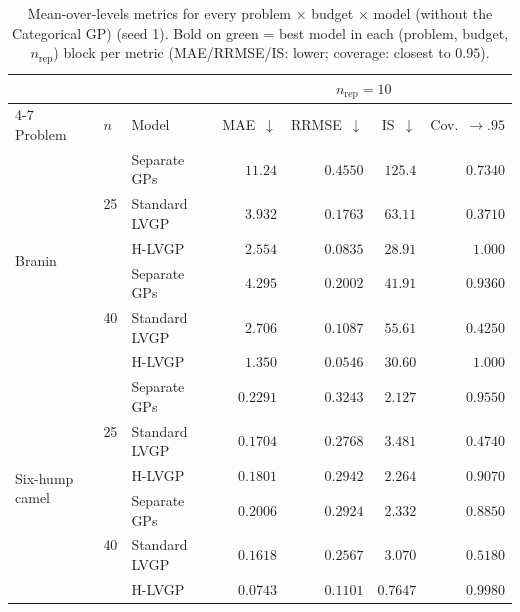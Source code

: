 \begin{table}[htbp]
\centering
\small
\setlength{\tabcolsep}{3.5pt}
\setlength{\fboxsep}{1.5pt}
\caption{Mean-over-levels metrics for every problem $\times$ budget $\times$ model (without the Categorical GP) (seed 1). Bold on green = best model in each (problem, budget, $n_{\mathrm{rep}}$) block per metric (MAE/RRMSE/IS: lower; coverage: closest to $0.95$).}
\label{tab:summary_nocat}
\begin{tabular}{lllrrrr}
\toprule
 & & & \multicolumn{4}{c}{$n_{\mathrm{rep}}=10$} \\
\cmidrule(lr){4-7}
Problem & $n$ & Model & MAE~$\downarrow$ & RRMSE~$\downarrow$ & IS~$\downarrow$ & Cov.~$\to.95$ \\
\midrule
\multirow{6}{*}{Branin} & \multirow{3}{*}{25} & Separate GPs & $11.24$ & $0.4550$ & $125.4$ & $0.7340$ \\
 &  & Standard LVGP & $3.932$ & $0.1763$ & $63.11$ & $0.3710$ \\
 &  & H-LVGP & \colorbox{green!20}{\boldmath$2.554$} & \colorbox{green!20}{\boldmath$0.0835$} & \colorbox{green!20}{\boldmath$28.91$} & \colorbox{green!20}{\boldmath$1.000$} \\
\cmidrule(lr){2-7}
 & \multirow{3}{*}{40} & Separate GPs & $4.295$ & $0.2002$ & $41.91$ & \colorbox{green!20}{\boldmath$0.9360$} \\
 &  & Standard LVGP & $2.706$ & $0.1087$ & $55.61$ & $0.4250$ \\
 &  & H-LVGP & \colorbox{green!20}{\boldmath$1.350$} & \colorbox{green!20}{\boldmath$0.0546$} & \colorbox{green!20}{\boldmath$30.60$} & $1.000$ \\
\midrule
\multirow{6}{*}{Six-hump camel} & \multirow{3}{*}{25} & Separate GPs & $0.2291$ & $0.3243$ & \colorbox{green!20}{\boldmath$2.127$} & \colorbox{green!20}{\boldmath$0.9550$} \\
 &  & Standard LVGP & \colorbox{green!20}{\boldmath$0.1704$} & \colorbox{green!20}{\boldmath$0.2768$} & $3.481$ & $0.4740$ \\
 &  & H-LVGP & $0.1801$ & $0.2942$ & $2.264$ & $0.9070$ \\
\cmidrule(lr){2-7}
 & \multirow{3}{*}{40} & Separate GPs & $0.2006$ & $0.2924$ & $2.332$ & $0.8850$ \\
 &  & Standard LVGP & $0.1618$ & $0.2567$ & $3.070$ & $0.5180$ \\
 &  & H-LVGP & \colorbox{green!20}{\boldmath$0.0743$} & \colorbox{green!20}{\boldmath$0.1101$} & \colorbox{green!20}{\boldmath$0.7647$} & \colorbox{green!20}{\boldmath$0.9980$} \\

\end{tabular}
\end{table}
